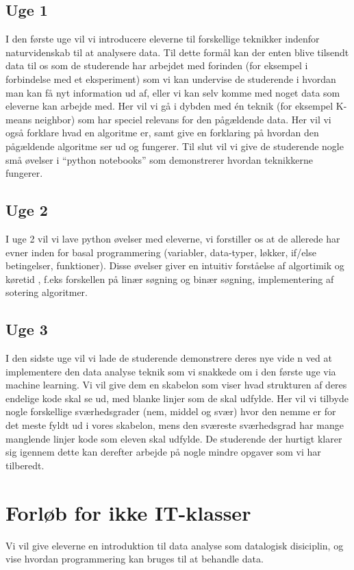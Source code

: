\documentclass[11pt]{article}
\begin{document}
    \subsection*{Uge 1}
        I den første uge vil vi introducere eleverne til forskellige teknikker
        indenfor naturvidenskab til at analysere data. Til dette formål kan der
        enten blive tilsendt data til os som de studerende har arbejdet med forinden
        (for eksempel i forbindelse med et eksperiment) som vi kan undervise de
        studerende i hvordan man kan få nyt information ud af,
        eller vi kan selv komme med noget data som eleverne kan arbejde med.
        Her vil vi gå i dybden med én teknik (for eksempel K-means neighbor)
        som har speciel relevans for den pågældende data. Her vil vi også forklare
        hvad en algoritme er, samt give en forklaring på hvordan den
        pågældende algoritme ser ud og fungerer. Til slut vil vi give de
        studerende nogle små øvelser i ``python notebooks'' som demonstrerer
        hvordan teknikkerne fungerer.

    \subsection*{Uge 2}
        I uge 2 vil vi lave python øvelser med eleverne, vi forstiller os at de allerede
        har evner inden for basal programmering
        (variabler, data-typer, løkker, if/else betingelser, funktioner).
        Disse øvelser giver en intuitiv forståelse af algortimik og køretid
        , f.eks forskellen på linær søgning og binær søgning, implementering af sotering algoritmer.

    \subsection{Uge 3}
        I den sidste uge vil vi lade de studerende demonstrere deres nye vide
    n ved at implementere den data analyse teknik som vi snakkede om i den første uge via machine learning. Vi vil give dem en skabelon som viser hvad strukturen af deres endelige kode skal se ud, med blanke linjer som de skal udfylde. Her vil vi tilbyde nogle forskellige sværhedsgrader (nem, middel og svær) hvor den nemme er for det meste fyldt ud i vores skabelon, mens den sværeste sværhedsgrad har mange manglende linjer kode som eleven skal udfylde. De studerende der hurtigt klarer sig igennem dette kan derefter arbejde på nogle mindre opgaver som vi har tilberedt.

\section{Forløb for ikke IT-klasser}
    Vi vil give eleverne en introduktion til data analyse som datalogisk disiciplin, og
    vise hvordan programmering kan bruges til at behandle data.
\end{document}
